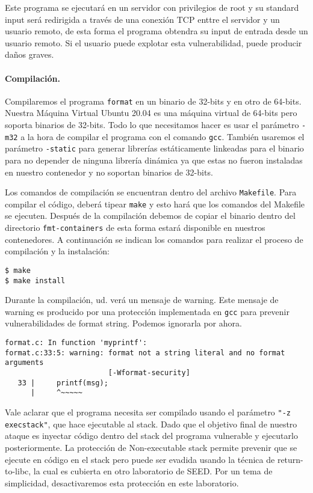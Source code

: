 Este programa se ejecutará en un servidor con privilegios de root y su standard input será redirigida a través de una conexión TCP enttre el servidor y un usuario remoto, de esta forma el programa obtendra su input de entrada desde un usuario remoto. Si el usuario puede explotar esta vulnerabilidad, puede producir daños graves.


\paragraph{Compilación.} 
Compilaremos el programa \texttt{format} en un binario de 32-bits y en otro de 64-bits. Nuestra Máquina Virtual Ubuntu 20.04 es una máquina virtual de 64-bits pero soporta binarios de 32-bits. Todo lo que necesitamos hacer es usar el parámetro \texttt{-m32} a la hora de compilar el programa con el comando  \texttt{gcc}.
También usaremos el parámetro \texttt{-static} para generar librerías estáticamente linkeadas para el binario para no depender de ninguna librería dinámica ya que estas no fueron instaladas en nuestro contenedor y no soportan binarios de 32-bits.

Los comandos de compilación se encuentran dentro del archivo \texttt{Makefile}. Para compilar el código, deberá tipear \texttt{make} y esto hará que los comandos del Makefile se ejecuten.
Después de la compilación debemos de copiar el binario dentro del directorio \texttt{fmt-containers} de esta forma estará disponible en nuestros contenedores.
A continuación se indican los comandos para realizar el proceso de compilación y la instalación:

\begin{lstlisting}
$ make
$ make install
\end{lstlisting}

Durante la compilación, ud. verá un mensaje de warning. Este mensaje de warning es producido por una protección implementada en \texttt{gcc} para prevenir vulnerabilidades de format string. Podemos ignorarla por ahora.

\begin{lstlisting}
format.c: In function 'myprintf':
format.c:33:5: warning: format not a string literal and no format arguments
                        [-Wformat-security]
   33 |     printf(msg);
      |     ^~~~~~
\end{lstlisting}

Vale aclarar que el programa necesita ser compilado usando el parámetro  \texttt{"-z execstack"}, que hace ejecutable al stack. Dado que el objetivo final de nuestro ataque es inyectar código dentro del stack del programa vulnerable y ejecutarlo posteriormente.
La protección de Non-executable stack permite prevenir que se ejecute en código en el stack pero puede ser evadida usando la técnica de return-to-libc, la cual es cubierta en otro laboratorio de SEED. Por un tema de simplicidad, desactivaremos esta protección en este laboratorio.


